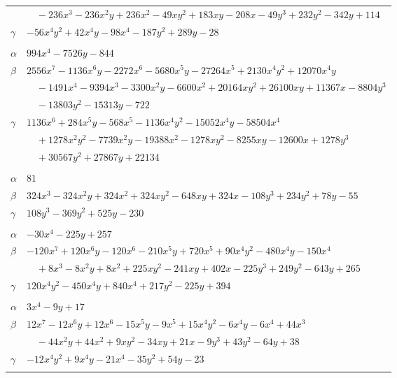 \documentclass[11pt]{article}
\begin{document}
\begin{longtable}{@{}ll@{}}
 & $\quad -236x^{3}-236x^{2}y+236x^{2}-49xy^{2}+183xy-208x-49y^{3}+232y^{2}-342y+114$\\
$\gamma$ & $-56x^{4}y^{2}+42x^{4}y-98x^{4}-187y^{2}+289y-28$\\
\addlinespace[3pt]
\multicolumn{2}{@{}l}{$\{i,j\}=\{4,19\}$, $k_{ij}=2^{3}\cdot 3\cdot 5^{2}$}\\
$\alpha$ & $994x^{4}-7526y-844$\\
$\beta$ & $2556x^{7}-1136x^{6}y-2272x^{6}-5680x^{5}y-27264x^{5}+2130x^{4}y^{2}+12070x^{4}y$\\
 & $\quad -1491x^{4}-9394x^{3}-3300x^{2}y-6600x^{2}+20164xy^{2}+26100xy+11367x-8804y^{3}$\\
 & $\quad -13803y^{2}-15313y-722$\\
$\gamma$ & $1136x^{6}+284x^{5}y-568x^{5}-1136x^{4}y^{2}-15052x^{4}y-58504x^{4}$\\
 & $\quad +1278x^{2}y^{2}-7739x^{2}y-19388x^{2}-1278xy^{2}-8255xy-12600x+1278y^{3}$\\
 & $\quad +30567y^{2}+27867y+22134$\\
\addlinespace[3pt]
\multicolumn{2}{@{}l}{$\{i,j\}=\{12,15\}$, $k_{ij}=2^{8}$}\\
$\alpha$ & $81$\\
$\beta$ & $324x^{3}-324x^{2}y+324x^{2}+324xy^{2}-648xy+324x-108y^{3}+234y^{2}+78y-55$\\
$\gamma$ & $108y^{3}-369y^{2}+525y-230$\\
\addlinespace[3pt]
\multicolumn{2}{@{}l}{$\{i,j\}=\{12,24\}$, $k_{ij}=2^{7}$}\\
$\alpha$ & $-30x^{4}-225y+257$\\
$\beta$ & $-120x^{7}+120x^{6}y-120x^{6}-210x^{5}y+720x^{5}+90x^{4}y^{2}-480x^{4}y-150x^{4}$\\
 & $\quad +8x^{3}-8x^{2}y+8x^{2}+225xy^{2}-241xy+402x-225y^{3}+249y^{2}-643y+265$\\
$\gamma$ & $120x^{4}y^{2}-450x^{4}y+840x^{4}+217y^{2}-225y+394$\\
\addlinespace[3pt]
\multicolumn{2}{@{}l}{$\{i,j\}=\{12,32\}$, $k_{ij}=2^{5}$}\\
$\alpha$ & $3x^{4}-9y+17$\\
$\beta$ & $12x^{7}-12x^{6}y+12x^{6}-15x^{5}y-9x^{5}+15x^{4}y^{2}-6x^{4}y-6x^{4}+44x^{3}$\\
 & $\quad -44x^{2}y+44x^{2}+9xy^{2}-34xy+21x-9y^{3}+43y^{2}-64y+38$\\
$\gamma$ & $-12x^{4}y^{2}+9x^{4}y-21x^{4}-35y^{2}+54y-23$\\
\addlinespace[3pt]

\end{longtable}
\end{document}
